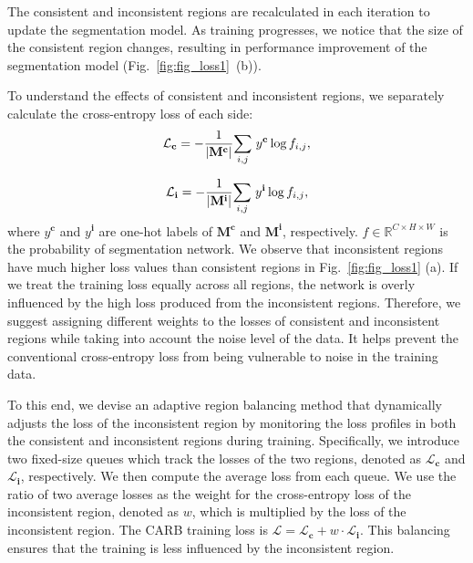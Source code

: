 \documentclass[letterpaper]{article} %
\begin{document}
The consistent and inconsistent regions are recalculated in each iteration to update the segmentation model. As training progresses, we notice that the size of the consistent region changes, resulting in performance improvement of the segmentation model (Fig.~\ref{fig:fig_loss1}~(b)). 

To understand the effects of consistent and inconsistent regions, we separately calculate the cross-entropy loss of each side: 
\begin{equation}
\label{eq_loss_con}
{\small
\mathcal{L}_\mathbf{c} = - \frac{1}{|\mathbf{M}^\mathbf{c}|} \underset{i,j}{\sum} \text{ } y^\mathbf{c} \log {f_{i,j}},
}
\end{equation}

\begin{equation}
\label{eq_loss_inc}
{\small
\mathcal{L}_\mathbf{i} = - \frac{1}{|\mathbf{M}^\mathbf{i}|} \underset{i,j}{\sum} \text{ } y^\mathbf{i} \log {f_{i,j}},
}
\end{equation}%
%
where $y^\mathbf{c}$ and $y^\mathbf{i}$ are one-hot labels of  $\mathbf{M}^\mathbf{c}$ and $\mathbf{M}^\mathbf{i}$, respectively. $f \in \mathbb{R}^{C \times H \times W}$ is the probability of segmentation network. We observe that inconsistent regions have much higher loss values than consistent regions in Fig.~\ref{fig:fig_loss1} (a). If we treat the training loss equally across all regions, the network is overly influenced by the high loss produced from the inconsistent regions. Therefore, we suggest assigning different weights to the losses of consistent and inconsistent regions while taking into account the noise level of the data. It helps prevent the conventional cross-entropy loss from being vulnerable to noise in the training data.

To this end, we devise an adaptive region balancing method that dynamically adjusts the loss of the inconsistent region by monitoring the loss profiles in both the consistent and inconsistent regions during training. Specifically, we introduce two fixed-size queues which track the losses of the two regions, denoted as $\mathcal{L}_\mathbf{c}$ and $\mathcal{L}_\mathbf{i}$, respectively. We then compute the average loss from each queue. We use the ratio of two average losses as the weight for the cross-entropy loss of the inconsistent region, denoted as $w$, which is multiplied by the loss of the inconsistent region. The CARB training loss is $\mathcal{L} = \mathcal{L}_\mathbf{c} + w \cdot \mathcal{L}_\mathbf{i}$. This balancing ensures that the training is less influenced by the inconsistent region. 
\end{document}
